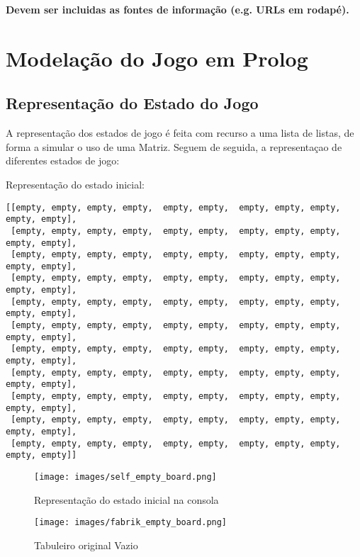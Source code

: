 \documentclass[a4paper]{article}
\begin{document}
\textbf{Devem ser incluidas as fontes de informação (e.g. URLs em rodapé).}

\newpage

\section{Modelação do Jogo em Prolog}
\subsection{Representação do Estado do Jogo}

A representação dos estados de jogo é feita com recurso a uma lista de listas, de forma a simular o uso de uma Matriz. Seguem de seguida, a representaçao de diferentes estados de jogo:\newline



Representação do estado inicial:

\begin{small}
\begin{lstlisting}
[[empty, empty, empty, empty,  empty, empty,  empty, empty, empty, empty, empty],
 [empty, empty, empty, empty,  empty, empty,  empty, empty, empty, empty, empty],
 [empty, empty, empty, empty,  empty, empty,  empty, empty, empty, empty, empty],
 [empty, empty, empty, empty,  empty, empty,  empty, empty, empty, empty, empty],
 [empty, empty, empty, empty,  empty, empty,  empty, empty, empty, empty, empty],
 [empty, empty, empty, empty,  empty, empty,  empty, empty, empty, empty, empty],
 [empty, empty, empty, empty,  empty, empty,  empty, empty, empty, empty, empty],
 [empty, empty, empty, empty,  empty, empty,  empty, empty, empty, empty, empty],
 [empty, empty, empty, empty,  empty, empty,  empty, empty, empty, empty, empty],
 [empty, empty, empty, empty,  empty, empty,  empty, empty, empty, empty, empty],
 [empty, empty, empty, empty,  empty, empty,  empty, empty, empty, empty, empty]]
\end{lstlisting}
\end{small}

\begin{figure}[h!]
\centering
\begin{minipage}{.35\textwidth}
	\centering
	\texttt{[image: images/self\_empty\_board.png]}
	\caption{Representação do estado inicial na consola}
	\label{Figura 4}
\end{minipage}
\quad \quad
\begin{minipage}{.35\textwidth}
	\centering
	\texttt{[image: images/fabrik\_empty\_board.png]}
	\caption{Tabuleiro original Vazio}
	\label{Figura 5}
\end{minipage}
\end{figure}
\end{document}

